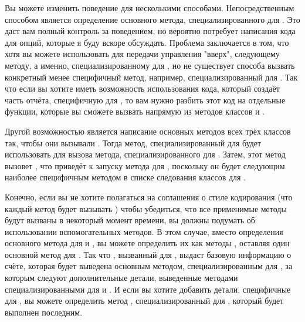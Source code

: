 Вы можете изменить поведение  для 
несколькими способами.  Непосредственным способом является определение основного метода,
специализированного для .  Это даст вам полный контроль за
поведением, но вероятно потребует написания кода для опций, которые я буду вскоре
обсуждать.  Проблема заключается в том, что хотя вы можете использовать
 для передачи управления "вверх", следующему методу, а именно,
специализированному для , но не существует способа вызвать
конкретный менее специфичный метод, например, специализированный для
.  Так что если вы хотите иметь возможность использования кода,
который создаёт часть отчёта, специфичную для , то вам нужно разбить
этот код на отдельные функции, которые вы сможете вызвать напрямую из методов
 классов  и .

Другой возможностью является написание основных методов всех трёх классов так, чтобы они
вызывали .  Тогда метод, специализированный для
 будет использовать  для вызова метода,
специализированного для .  Затем, этот метод вызовет
, что приведёт к запуску метода для ,
поскольку он будет следующим наиболее специфичным методом в списке следования классов для
.

Конечно, если вы не хотите полагаться на соглашения о стиле кодирования (что каждый метод
будет вызывать ) чтобы убедиться, что все применимые методы будут
вызваны в некоторый момент времени, вы должны подумать об использовании вспомогательных
методов.  В этом случае, вместо определения основного метода  для
 и , вы можете определить их как методы
, оставляя один основной метод для .  Так что
, вызванный для , выдаст базовую
информацию о счёте, которая будет выведена основным методом, специализированным для
, за которым следуют дополнительные детали, выведенные методами
 специализированными для  и . И
если вы хотите добавить детали, специфичные для , вы можете
определить метод , специализированный для ,
который будет выполнен последним.

